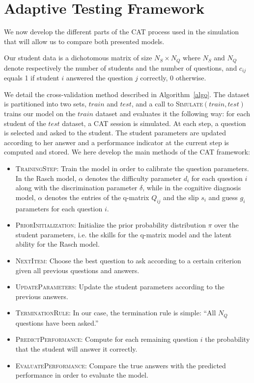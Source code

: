 \documentclass{edm_template}
\begin{document}

\section{Adaptive Testing Framework}

We now develop the different parts of the CAT process used in the simulation that will allow us to compare both presented models.

Our student data is a dichotomous matrix of size $N_S \times N_Q$ where $N_S$ and $N_Q$ denote respectively the number of students and the number of questions, and $c_{ij}$ equals 1 if student $i$ answered the question $j$ correctly, 0 otherwise. 

We detail the cross-validation method described in Algorithm~\ref{algo}. The dataset is partitioned into two sets, $train$ and $test$, and a call to \textsc{Simulate}$(train, test)$ trains our model on the $train$ dataset and evaluates it the following way: for each student of the $test$ dataset, a CAT session is simulated. At each step, a question is selected and asked to the student. The student parameters are updated according to her answer and a performance indicator at the current step is computed and stored. We here develop the main methods of the CAT framework:
\begin{itemize}
\item \textsc{TrainingStep}: Train the model in order to calibrate the question parameters. In the Rasch model, $\alpha$ denotes the difficulty parameter $d_i$ for each question $i$ along with the discrimination parameter $\delta$, while in the cognitive diagnosis model, $\alpha$ denotes the entries of the q-matrix $Q_{ij}$ and the slip $s_i$ and guess $g_i$ parameters for each question $i$.
\item \textsc{PriorInitialization}: Initialize the prior probability distribution $\pi$ over the student parameters, i.e. the skills for the q-matrix model and the latent ability for the Rasch model. 
\item \textsc{NextItem}: Choose the best question to ask according to a certain criterion given all previous questions and answers. 
\item \textsc{UpdateParameters}: Update the student parameters according to the previous answers.
\item \textsc{TerminationRule}: In our case, the termination rule is simple: ``All $N_Q$ questions have been asked.''
\item \textsc{PredictPerformance}: Compute for each remaining question $i$ the probability that the student will answer it correctly.
\item \textsc{EvaluatePerformance}: Compare the true answers with the predicted performance in order to evaluate the model. 
\end{itemize}
\end{document}
